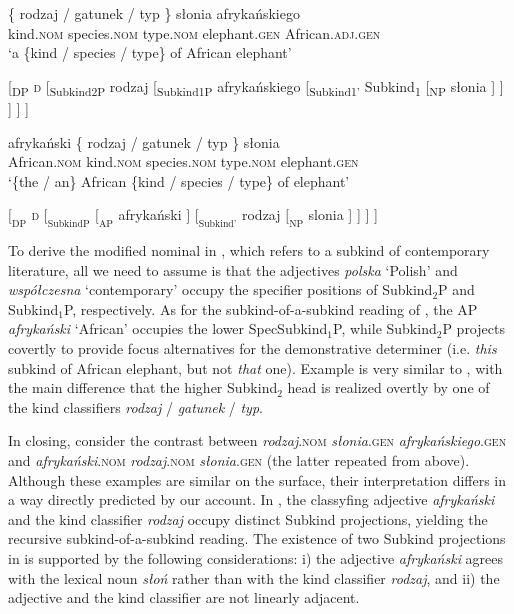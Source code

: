 \documentclass[output=paper,
colorlinks,
citecolor=brown,
newtxmath
]{langscibook}
\begin{document}
\ea \label{ex:recursive_3}
\ea \gll
\{ rodzaj / gatunek / typ \} słonia afrykańskiego\\
{ } kind.\textsc{nom} { } species.\textsc{nom} { } type.\textsc{nom} { } elephant.\textsc{gen} African.\textsc{adj}.\textsc{gen}\\
\glt `a \{kind / species / type\} of African elephant'

\ex
{}[\textsubscript{DP} \textsc{d} [\textsubscript{Subkind2P} rodzaj [\textsubscript{Subkind1P} afrykańskiego [\textsubscript{Subkind1'} Subkind\textsubscript{1} [\textsubscript{NP} słonia ] ] ] ] ]
\z \z

\ea \label{ex:recursive_4}
\ea \gll
afrykański \{ rodzaj / gatunek / typ \} słonia\\
African.\textsc{nom} { } kind.\textsc{nom} { } species.\textsc{nom} { } type.\textsc{nom} { } elephant.\textsc{gen}\\
\glt `\{the / an\} African \{kind / species / type\} of elephant'

\ex $[_\text{DP}$ \textsc{d} $[_\text{SubkindP}$ $[_\text{AP}$ afrykański $]$ $[_\text{Subkind'}$ rodzaj $[_\text{NP}$ slonia ] ] ] ]
\z \z

\noindent
To derive the modified nominal in , which refers to a subkind of contemporary literature, all we need to assume is that the adjectives \textit{polska}{ }`Polish' and \textit{współczesna}{ }`contemporary' occupy the specifier positions of Subkind$_2$P and Subkind$_1$P, respectively. As for the subkind-of-a-subkind reading of , the AP \textit{afrykański} `African' occupies the lower SpecSubkind$_1$P, while Subkind$_2$P projects covertly to provide focus alternatives for the demonstrative determiner (i.e. \textit{this} subkind of African elephant, but not \textit{that} one). Example  is very similar to , with the main difference that the higher Subkind$_2$ head is realized overtly by one of the kind classifiers \textit{rodzaj} / \textit{gatunek} / \textit{typ}.

In closing, consider the contrast between \textit{rodzaj}.\textsc{nom} \textit{słonia}.\textsc{gen} \textit{afrykańskiego}.\textsc{gen}  and \textit{afrykański}.\textsc{nom} \textit{rodzaj}.\textsc{nom} \textit{słonia}.\textsc{gen}  (the latter repeated from  above). Although these examples are similar on the surface, their interpretation differs in a way directly predicted by our account. In ,  the classyfing adjective \textit{afrykański} and the kind classifier \textit{rodzaj} occupy distinct Subkind projections, yielding the recursive subkind-of-a-subkind reading. The existence of two Subkind projections in  is supported by the following considerations: i) the adjective \textit{afrykański} agrees with the lexical noun \textit{słoń} rather than with the kind classifier \textit{rodzaj}, and ii) the adjective and the kind classifier are not linearly adjacent.
\end{document}
